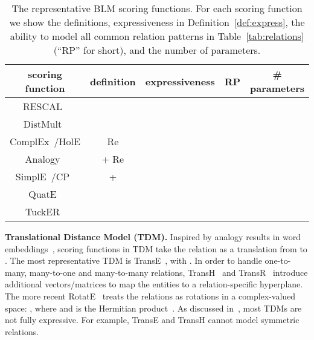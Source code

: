 \documentclass[10pt,journal,compsoc]{IEEEtran}
\newcommand{\parabegin}[1]{\vspace{3px}\noindent\textbf{#1}}
\begin{document}
\begin{table*}[ht]
	\centering
	\caption{The representative BLM scoring functions. 
		For each scoring function we show the definitions, 
		expressiveness in Definition~\ref{def:express},
		the ability to model all common relation patterns in Table~\ref{tab:relations} (``RP'' for short),
		and the number of parameters.}
	\vspace{-10px}
	\label{tab:scofun}
	\setlength\tabcolsep{8pt}
	\renewcommand{\arraystretch}{1.3}
	\begin{tabular}{c |  c | c | c | c}
		\toprule
		scoring function & definition & expressiveness    &  RP  & \# parameters                                                        \\ \midrule
		RESCAL~\cite{nickel2011three}                                                                               &     &     &    &    \\
		              DistMult~\cite{yang2014embedding}      &      &   &  &               \\
ComplEx~\cite{trouillon2017knowledge}/HolE
		\cite{nickel2016holographic} & Re         &     &  &     \\
		Analogy~\cite{liu2017analogical}  &  + Re         &     &  &     \\
		{SimplE~\cite{kazemi2018simple}/CP~\cite{lacroix2018canonical}}                                           &  +                  &   &    &                            \\
		 QuatE~\cite{zhang2019quaternion}                                                                            &                                                                                                                                                         &    &   &                            \\
		TuckER~\cite{balavzevic2019tucker}                                                                          &                                                                                                                                &   &    &                         \\ \bottomrule
	\end{tabular} 
	\vspace{-7px}
\end{table*}



\parabegin{Translational Distance Model (TDM).}
Inspired by analogy results in word embeddings~\cite{bengio2013representation}, 
scoring functions in TDM 
take the relation  as a translation from  to .
The most representative TDM is TransE~\cite{bordes2013translating}, with .
In order to handle one-to-many, many-to-one and many-to-many relations,
TransH~\cite{wang2014knowledge} and TransR~\cite{fan2014transition} introduce additional vectors/matrices to map
the entities to a relation-specific hyperplane.
The more recent
RotatE~\cite{sun2019rotate} treats the relations as rotations in a
complex-valued space:
,
where 
and  is the Hermitian product~\cite{trouillon2017knowledge}.
As discussed in~\cite{wang2017multi},
most TDMs are not fully expressive. For example,
TransE and TransH cannot model symmetric relations.
\end{document}
